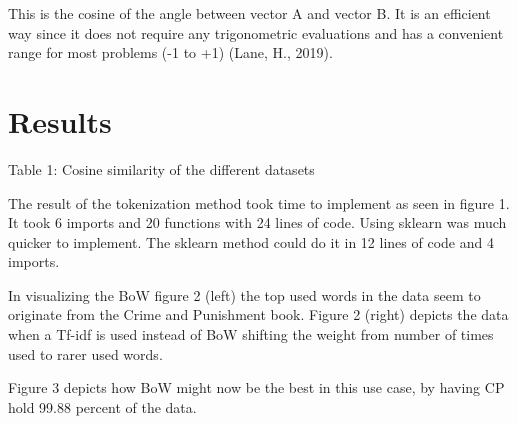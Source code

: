 \documentclass{article}
\begin{document}
\begin{multicols}{2}
This is the cosine of the angle between vector A and vector B. It is an efficient way since it does not require any trigonometric evaluations and has a convenient range for most problems (-1 to +1) (Lane, H., 2019).

\section{Results}


{\small
  \vspace{6pt}
  Table 1: Cosine similarity of the different datasets
  \par
  \vspace{6pt}
}

The result of the tokenization method took time to implement as seen in figure 1. It took 6 imports and 20 functions with 24 lines of code. Using sklearn was much quicker to implement. The sklearn method could do it in 12 lines of code and 4 imports. 

In visualizing the BoW figure 2 (left) the top used words in the data seem to originate from the Crime and Punishment book. Figure 2 (right) depicts the data when a Tf-idf is used instead of BoW shifting the weight from number of times used to rarer used words.


Figure 3 depicts how BoW might now be the best in this use case, by having CP hold 99.88 percent of the data.
\vspace{12pt}



\end{multicols}
\end{document}
